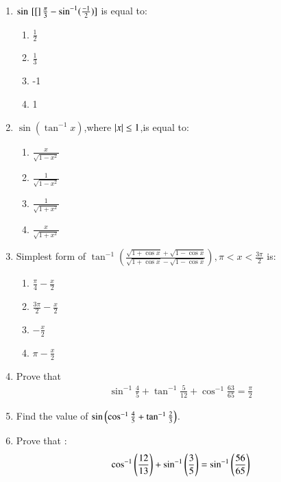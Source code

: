 \begin{enumerate}[label=\thesubsection.\arabic*.,ref=\thesubsection.\theenumi]
\hfill{}\item $ \sin {}\left[[\right]\frac{\pi}{3}-\sin^{-1}(\frac{-1}{2})] $ is equal to:

\begin{enumerate}

\item $\frac{1}{2}$
\item $\frac{1}{3}$
\item -1
\item 1

\end{enumerate}

\hfill{}\item $ \sin(\tan^{-1}x)$,where $\left\vert x\right\vert \le 1 $,is equal to:

\begin{enumerate}

\item$\frac{x}{\sqrt{1-x^2}}$
\item$\frac{1}{\sqrt{1-x^2}}$ 
\item$\frac{1}{\sqrt{1+x^2}}$
\item$\frac{x}{\sqrt{1+x^2}}$

\end{enumerate}  

\hfill{}\item Simplest form of $ \tan^{-1}(\frac{\sqrt{1+\cos x}+\sqrt{1-\cos x}}{\sqrt{1+\cos x}- \sqrt {1- \cos x}}) , \pi < x < \frac{3\pi}{2}$ is:

\begin{enumerate}

  \item$\frac{\pi}{4} - \frac{x}{2}$
  \item$\frac{3\pi}{2} - \frac{x}{2}$
  \item$-\frac{x}{2}$
  \item${\pi} - \frac{x}{2}$

\end{enumerate}
\hfill{}
\item Prove that 
\begin{align*}
    \sin^{-1}\frac{4}{5}+\tan^{-1}\frac{5}{12}+\cos^{-1}\frac{63}{65}=\frac{\pi}{2}
\end{align*}
\hfill{}
\item Find the value of $\sin\left(\cos^{-1}{\frac{4}{5}}+{\tan^{-1}{\frac{2}{3}}}\right)$.
\hfill{}
\item Prove that :
\begin{align*}
\cos^{-1}\left(\frac{12}{13}\right)+\sin^{-1}\left(\frac{3}{5}\right)=\sin^{-1} \left(\frac{56}{65}\right)
\end{align*}
\hfill{}


\end{enumerate}
